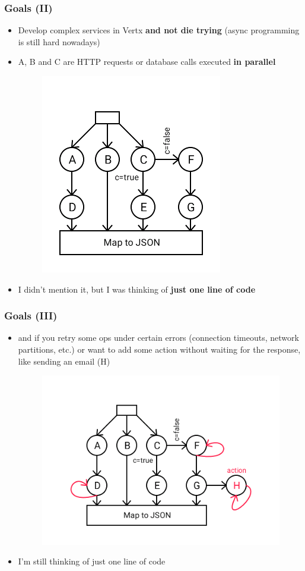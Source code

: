\documentclass{beamer}
\begin{document}
\begin{frame}
\frametitle{Goals (II)}    
    \begin{itemize}
    \item<1->  Develop complex services in Vertx \textbf{and not die trying} (async programming is still hard nowadays)
    \item<2->  A, B and C are HTTP requests or database calls executed \textbf{in parallel} 
   \begin{figure}\includegraphics[scale=0.4]{images/flow-1.png}\end{figure}
     \item<3->  I didn't mention it, but I was thinking of \textbf{just one line of code}
     \end{itemize}      
\end{frame} 


\begin{frame}
\frametitle{Goals (III)}    
 \begin{itemize}
    \item<1-> and if you retry some ops under certain errors (connection timeouts, network partitions, etc.) or want to add some action without waiting for the response, like sending an email (H)
    \begin{figure}
\includegraphics[scale=0.4]{images/flow-2.png}
\end{figure}
     \item<2->  I'm still thinking of just one line of code
     \end{itemize}    
\end{frame} 
\end{document}
